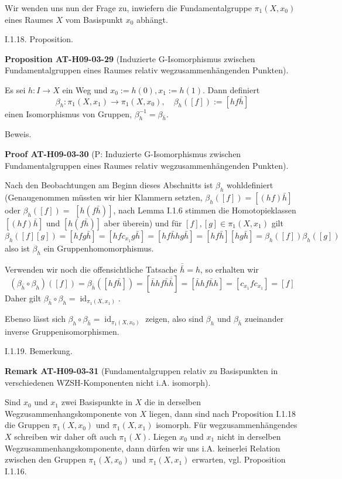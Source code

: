 \documentclass[10pt, letterpaper]{article}
\newcommand{\CustomHeading}[3]{%
  \par\medskip\noindent%
  \textbf{#1 #2} \textnormal{(#3)}.\enskip%
}
\newenvironment{PROP}[2]{\begin{unitbox}\CustomHeading{Proposition}{#1}{#2}}{\end{unitbox}}
\newenvironment{REM}[2]{\begin{unitbox}\CustomHeading{Remark}{#1}{#2}}{\end{unitbox}}
\newenvironment{PROOF}[2]{\begin{unitbox}\CustomHeading{Proof}{#1}{#2}}{\end{unitbox}}
\begin{document}
Wir wenden uns nun der Frage zu, inwiefern die Fundamentalgruppe $\pi_{1}\left(X, x_{0}\right)$ eines Raumes $X$ vom Basispunkt $x_{0}$ abhängt.


I.1.18. Proposition. 

\begin{PROP}{AT-H09-03-29}{Induzierte G-Isomorphismus zwischen Fundamentalgruppen eines Raumes relativ wegzusammenhängenden Punkten}
Es sei $h: I \rightarrow X$ ein Weg und $x_{0}:=h(0), x_{1}:=h(1)$. Dann definiert
$$
\beta_{h}: \pi_{1}\left(X, x_{1}\right) \rightarrow \pi_{1}\left(X, x_{0}\right), \quad \beta_{h}([f]):=[h f \bar{h}]
$$
einen Isomorphismus von Gruppen, $\beta_{h}^{-1}=\beta_{\bar{h}}$.
\end{PROP}


Beweis. 

\begin{PROOF}{AT-H09-03-30}{P: Induzierte G-Isomorphismus zwischen Fundamentalgruppen eines Raumes relativ wegzusammenhängenden Punkten}
Nach den Beobachtungen am Beginn dieses Abschnitts ist $\beta_{h}$ wohldefiniert (Genaugenommen müssten wir hier Klammern setzten, $\beta_{h}([f])=[(h f) \bar{h}]$ oder $\beta_{h}([f])=$ $[h(f \bar{h})]$, nach Lemma I.1.6 stimmen die Homotopieklassen $[(h f) \bar{h}]$ und $[h(f \bar{h})]$ aber überein) und für $[f],[g] \in \pi_{1}\left(X, x_{1}\right)$ gilt 
$$\beta_{h}([f][g])=[h f g \bar{h}]=\left[h f c_{x_{1}} g \bar{h}\right]=[h f \bar{h} h g \bar{h}]=[h f \bar{h}][h g \bar{h}]=\beta_{h}([f]) \beta_{h}([g])$$ 
also ist $\beta_{h}$ ein Gruppenhomomorphismus. 

Verwenden wir noch die offensichtliche Tatsache $\overline{\bar{h}}=h$, so erhalten wir 
$$\left(\beta_{\bar{h}} \circ \beta_{h}\right)([f])=\beta_{\bar{h}}([h f \bar{h}])=[\bar{h} h f \bar{h} \overline{\bar{h}}]=[\bar{h} h f \bar{h} h]=\left[c_{x_{1}} f c_{x_{1}}\right]=[f]$$ 
Daher gilt $\beta_{\bar{h}} \circ \beta_{h}=\operatorname{id}_{\pi_{1}\left(X, x_{1}\right)}$. 

Ebenso lässt sich $\beta_{h} \circ \beta_{\bar{h}}=\operatorname{id}_{\pi_{1}\left(X, x_{0}\right)}$ zeigen, also sind $\beta_{h}$ und $\beta_{\bar{h}}$ zueinander inverse Gruppenisomorphismen.
\end{PROOF}



I.1.19. Bemerkung. 

\begin{REM}{AT-H09-03-31}{Fundamentalgruppen relativ zu Basispunkten in verschiedenen WZSH-Komponenten nicht i.A. isomorph}
Sind $x_{0}$ und $x_{1}$ zwei Basispunkte in $X$ die in derselben Wegzusammenhangskomponente von $X$ liegen, dann sind nach Proposition I.1.18 die Gruppen $\pi_{1}\left(X, x_{0}\right)$ und $\pi_{1}\left(X, x_{1}\right)$ isomorph. Für wegzusammenhängendes $X$ schreiben wir daher oft auch $\pi_{1}(X)$. Liegen $x_{0}$ und $x_{1}$ nicht in derselben Wegzusammenhangskomponente, dann dürfen wir uns i.A. keinerlei Relation zwischen den Gruppen $\pi_{1}\left(X, x_{0}\right)$ und $\pi_{1}\left(X, x_{1}\right)$ erwarten, vgl. Proposition I.1.16.
\end{REM}
\end{document}
